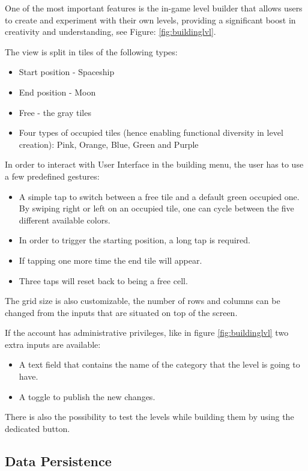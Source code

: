 \documentclass[12 pct]{report}
\begin{document}
One of the most important features is the in-game level builder that allows users to create and experiment with their own levels, providing a significant boost in creativity and understanding, see Figure: \ref{fig:buildinglvl}. 

The view is split in tiles of the following types:

\begin{itemize}
\item Start position - Spaceship
\item End position - Moon
\item Free - the gray tiles
\item Four types of occupied tiles (hence enabling functional diversity in level creation): Pink, Orange, Blue, Green and Purple
\end{itemize}

In order to interact with User Interface in the building menu, the user has to use a few predefined gestures:
\begin{itemize}
\item A simple tap to switch between a free tile and a default green occupied one.
By swiping right or left on an occupied tile, one can cycle between the five different available colors. 
\item In order to trigger the starting position, a long tap is required.
\item If tapping one more time the end tile will appear.
\item Three taps will reset back to being a free cell.
\end{itemize}

The grid size is also customizable, the number of rows and columns can be changed from the inputs that are situated on top of the screen. 

If the account has administrative privileges, like in figure \ref{fig:buildinglvl} two extra inputs are available: 
\begin{itemize}
\item A text field that contains the name of the category that the level is going to have. 
\item A toggle to publish the new changes.
\end{itemize} 

There is also the possibility to test the levels while building them by using the dedicated button.

\subsection*{Data Persistence}
\end{document}

